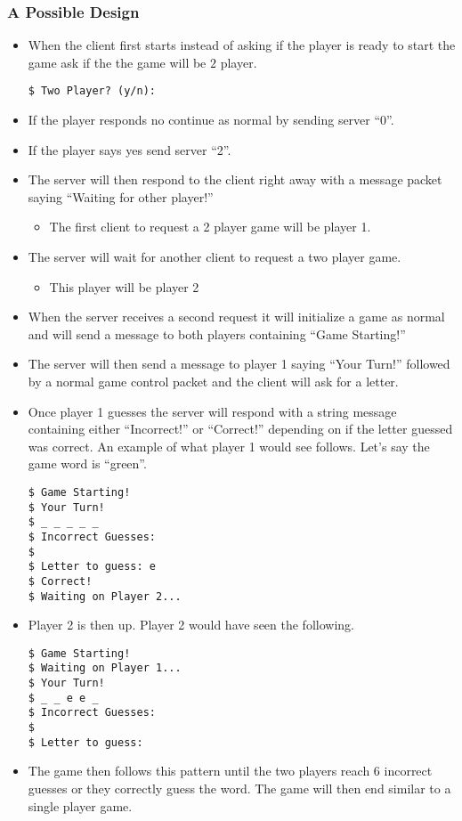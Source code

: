 \documentclass[12pt]{article}
\begin{document}
\subsubsection{A Possible Design}\label{subsubsec: possibleDesign}
\begin{itemize}
\item When the client first starts instead of asking if the player is ready to start the game ask if 
the the game will be $2$ player. 
\begin{verbatim}
$ Two Player? (y/n):
\end{verbatim}
\item If the player responds no continue as normal by sending server ``0''.
\item If the player says yes send server ``2''.
\item The server will then respond to the client right away with a message packet saying 
``Waiting for other player!''
\begin{itemize}
\item The first client to request a 2 player game will be player 1.
\end{itemize}
\item The server will wait for another client to request a two player game. 
\begin{itemize}
\item This player will be player 2 
\end{itemize}
\item When the server receives a second request it will initialize a game as normal and will 
send a message to both players containing ``Game Starting!''
\item The server will then send a message to player 1 saying ``Your Turn!'' followed by a 
normal game control packet and the client will ask for a letter. 
\item Once player 1 guesses the server will respond with a string message containing either 
``Incorrect!'' or ``Correct!'' depending on if the letter guessed was correct. An example of 
what player 1 would see follows. Let’s say the game word is ``green''. 
\begin{verbatim}
$ Game Starting! 
$ Your Turn! 
$ _ _ _ _ _ 
$ Incorrect Guesses: 
$  
$ Letter to guess: e 
$ Correct! 
$ Waiting on Player 2... 
\end{verbatim}
\item Player 2 is then up. Player 2 would have seen the following. 
\begin{verbatim}
$ Game Starting! 
$ Waiting on Player 1... 
$ Your Turn! 
$ _ _ e e _ 
$ Incorrect Guesses: 
$  
$ Letter to guess: 
\end{verbatim}

\item The game then follows this pattern until the two players reach 6 incorrect guesses or 
they correctly guess the word. The game will then end similar to a single player game. 

\end{itemize}
\end{document}
